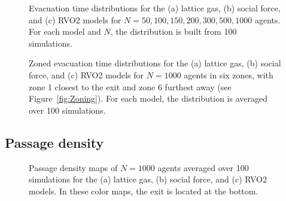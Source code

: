 \begin{figure}[htbp]
\caption{Evacuation time distributions for the (a) lattice gas, (b) social force, and (c) RVO2 models for $N = 50, 100, 150, 200, 300, 500, 1000$ agents. For each model and $N$, the distribution is built from 100 simulations.}
\label{fig:EvacTime}
\end{figure}

\begin{figure}[htbp]
\caption{Zoned evacuation time distributions for the (a) lattice gas, (b) social force, and (c) RVO2 models for $N = 1000$ agents in six zones, with zone 1 closest to the exit and zone 6 furthest away (see Figure~\ref{fig:Zoning}). For each model, the distribution is averaged over 100 simulations.}
\label{fig:ZoningEvac}
\end{figure}



\subsection{Passage density}

\begin{figure}[htbp]
\caption{Passage density maps of $N = 1000$ agents averaged over 100 simulations for the (a) lattice gas, (b) social force, and (c) RVO2 models. In these color maps, the exit is located at the bottom.}
\label{fig:DensityMap}
\end{figure}


